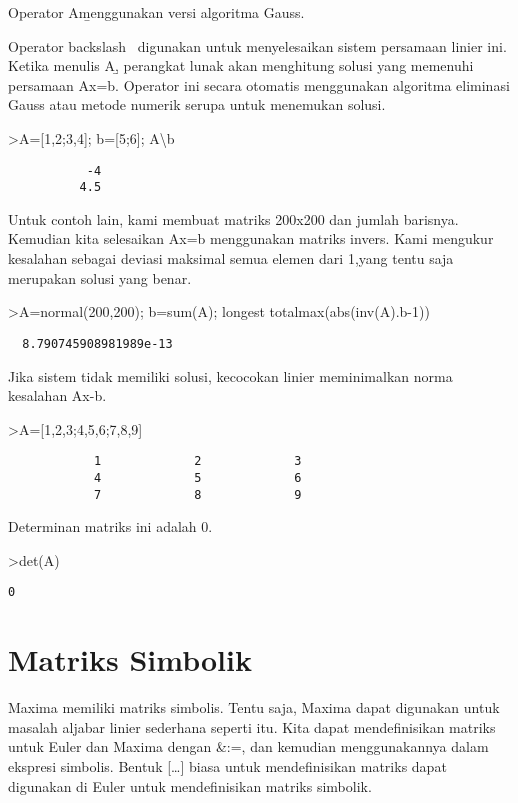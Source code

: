 \documentclass[
]{book}
\begin{document}
Operator A\b menggunakan versi algoritma Gauss.

Operator backslash ~digunakan untuk menyelesaikan sistem persamaan linier ini. Ketika menulis A\b, perangkat lunak akan menghitung solusi yang memenuhi persamaan Ax=b. Operator ini secara otomatis menggunakan algoritma eliminasi Gauss atau metode numerik serupa untuk menemukan solusi.

\textgreater A={[}1,2;3,4{]}; b={[}5;6{]}; A\textbackslash b

\begin{verbatim}
           -4 
          4.5 
\end{verbatim}

Untuk contoh lain, kami membuat matriks 200x200 dan jumlah barisnya. Kemudian kita selesaikan Ax=b menggunakan matriks invers. Kami mengukur kesalahan sebagai deviasi maksimal semua elemen dari 1,yang tentu saja merupakan solusi yang benar.

\textgreater A=normal(200,200); b=sum(A); longest totalmax(abs(inv(A).b-1))

\begin{verbatim}
  8.790745908981989e-13 
\end{verbatim}

Jika sistem tidak memiliki solusi, kecocokan linier meminimalkan norma kesalahan Ax-b.

\textgreater A={[}1,2,3;4,5,6;7,8,9{]}

\begin{verbatim}
            1             2             3 
            4             5             6 
            7             8             9 
\end{verbatim}

Determinan matriks ini adalah 0.

\textgreater det(A)

\begin{verbatim}
0
\end{verbatim}

\chapter{Matriks Simbolik}\label{matriks-simbolik}

Maxima memiliki matriks simbolis. Tentu saja, Maxima dapat digunakan untuk masalah aljabar linier sederhana seperti itu. Kita dapat mendefinisikan matriks untuk Euler dan Maxima dengan \&:=, dan kemudian menggunakannya dalam ekspresi simbolis. Bentuk {[}\ldots{]} biasa untuk mendefinisikan matriks dapat digunakan di Euler untuk mendefinisikan matriks simbolik.
\end{document}
